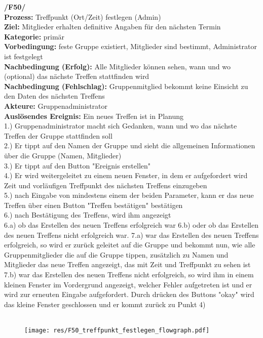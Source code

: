 \textbf{/F50/} \\
\textbf{Prozess:} Treffpunkt (Ort/Zeit) festlegen (Admin)\\
\textbf{Ziel:} Mitglieder erhalten definitive Angaben für den nächsten Termin\\
\textbf{Kategorie:} primär\\
\textbf{Vorbedingung:} feste Gruppe existiert, Mitglieder sind bestimmt, Administrator ist festgelegt\\
\textbf{Nachbedingung (Erfolg):} Alle Mitglieder können sehen, wann und wo (optional) das nächste Treffen stattfinden wird\\
\textbf{Nachbedingung (Fehlschlag):} Gruppenmitglied bekommt keine Einsicht zu den Daten des nächsten Treffens\\
\textbf{Akteure:} Gruppenadministrator\\
\textbf{Auslösendes Ereignis:} Ein neues Treffen ist in Planung\\
1.) Gruppenadministrator macht sich Gedanken, wann und wo das nächste Treffen der Gruppe stattfinden soll\\
2.) Er tippt auf den Namen der Gruppe und sieht die allgemeinen Informationen über die Gruppe (Namen, Mitglieder)\\
3.) Er tippt auf den Button "Ereignis erstellen"\\
4.) Er wird weitergeleitet zu einem neuen Fenster, in dem er aufgefordert wird Zeit und vorläufigen Treffpunkt des nächsten Treffens einzugeben\\
5.) nach Eingabe von mindestens einem der beiden Parameter, kann er das neue Treffen über einen Button "Treffen bestätigen" bestätigen\\
6.) nach Bestätigung des Treffens, wird ihm angezeigt\\
6.a) ob das Erstellen des neuen Treffens erfolgreich war
6.b) oder ob das Erstellen des neuen Treffens nicht erfolgreich war.
7.a) war das Erstellen des neuen Treffens erfolgreich, so wird er zurück geleitet auf die Gruppe und bekommt nun, wie alle Gruppenmitglieder die auf die Gruppe tippen, zusätzlich zu Namen und Mitglieder das neue Treffen angezeigt, das mit Zeit und Treffpunkt zu sehen ist\\
7.b) war das Erstellen des neuen Treffens nicht erfolgreich, so wird ihm in einem kleinen Fenster im Vordergrund angezeigt, welcher Fehler aufgetreten ist und er wird zur erneuten Eingabe aufgefordert. Durch drücken des Buttons "okay" wird das kleine Fenster geschlossen und er kommt zurück zu Punkt 4)\\ \\

\begin{figure} [H]
	\centering
	\texttt{[image: res/F50\_treffpunkt\_festlegen\_flowgraph.pdf]}
\end{figure}

